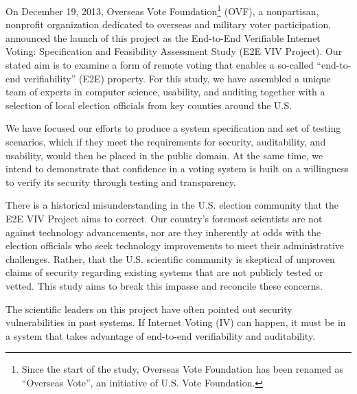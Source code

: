 On December 19, 2013, Overseas Vote Foundation\footnote{Since the
  start of the study, Overseas Vote Foundation has been renamed as
  “Overseas Vote”, an initiative of U.S. Vote Foundation.} (OVF), a
nonpartisan, nonprofit organization dedicated to overseas and military
voter participation, announced the launch of this project as the
End-to-End Verifiable Internet Voting: Specification and Feasibility
Assessment Study (E2E VIV Project). Our stated aim is to examine a
form of remote voting that enables a so-called “end-to-end
verifiability” (E2E) property. For this study, we have assembled a
unique team of experts in computer science, usability, and auditing
together with a selection of local election officials from key
counties around the U.S.

We have focused our efforts to produce a system specification and set
of testing scenarios, which if they meet the requirements for
security, auditability, and usability, would then be placed in the
public domain. At the same time, we intend to demonstrate that
confidence in a voting system is built on a willingness to verify its
security through testing and transparency.

There is a historical misunderstanding in the U.S. election community
that the E2E VIV Project aims to correct. Our country’s foremost
scientists are not against technology advancements, nor are they
inherently at odds with the election officials who seek technology
improvements to meet their administrative challenges. Rather, that the
U.S. scientific community is skeptical of unproven claims of security
regarding existing systems that are not publicly tested or vetted. This
study aims to break this impasse and reconcile these concerns.

The scientific leaders on this project have often pointed out security
vulnerabilities in past systems. If Internet Voting (IV) can happen, it must be in a system that takes advantage of end-to-end verifiability and auditability. 
 


